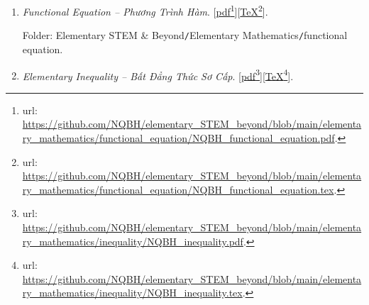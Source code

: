 \documentclass[12pt,oneside]{book}
\begin{document}
\begin{enumerate}
	Folder: {\sf Elementary STEM \& Beyond{\tt/}Elementary Mathematics{\tt/}equation \& inequation{\tt/}problem}.
	\begin{itemize}
		\item {\it Problem \& Solution: Equation \& Inequation -- Bài Tập \& Lời Giải: Phương Trình \& Bất Phương Trình}. [\href{https://github.com/NQBH/elementary_STEM_beyond/blob/main/elementary_mathematics/equation_inequation/solution/NQBH_equation_inequation_solution.pdf}{pdf}\footnote{{\sc url}: \url{https://github.com/NQBH/elementary_STEM_beyond/blob/main/elementary_mathematics/equation_inequation/solution/NQBH_equation_inequation_solution.pdf}.}][\href{https://github.com/NQBH/elementary_STEM_beyond/blob/main/elementary_mathematics/equation_inequation/solution/NQBH_equation_inequation_solution.tex}{\TeX}\footnote{{\sc url}: \url{https://github.com/NQBH/elementary_STEM_beyond/blob/main/elementary_mathematics/equation_inequation/solution/NQBH_equation_inequation_solution.tex}.}].
		
		Folder: {\sf Elementary STEM \& Beyond{\tt/}Elementary Mathematics{\tt/}equation \& inequation{\tt/}solution}.
	\end{itemize}
	\item {\it Functional Equation -- Phương Trình Hàm}. [\href{https://github.com/NQBH/elementary_STEM_beyond/blob/main/elementary_mathematics/functional_equation/NQBH_functional_equation.pdf}{pdf}\footnote{{\sc url}: \url{https://github.com/NQBH/elementary_STEM_beyond/blob/main/elementary_mathematics/functional_equation/NQBH_functional_equation.pdf}.}][\href{https://github.com/NQBH/elementary_STEM_beyond/blob/main/elementary_mathematics/functional_equation/NQBH_functional_equation.tex}{\TeX}\footnote{{\sc url}: \url{https://github.com/NQBH/elementary_STEM_beyond/blob/main/elementary_mathematics/functional_equation/NQBH_functional_equation.tex}.}].
	
	Folder: {\sf Elementary STEM \& Beyond{\tt/}Elementary Mathematics{\tt/}functional equation}.
	\item {\it Elementary Inequality -- Bất Đẳng Thức Sơ Cấp}. [\href{https://github.com/NQBH/elementary_STEM_beyond/blob/main/elementary_mathematics/inequality/NQBH_inequality.pdf}{pdf}\footnote{{\sc url}: \url{https://github.com/NQBH/elementary_STEM_beyond/blob/main/elementary_mathematics/inequality/NQBH_inequality.pdf}.}][\href{https://github.com/NQBH/elementary_STEM_beyond/blob/main/elementary_mathematics/inequality/NQBH_inequality.tex}{\TeX}\footnote{{\sc url}: \url{https://github.com/NQBH/elementary_STEM_beyond/blob/main/elementary_mathematics/inequality/NQBH_inequality.tex}.}].
	

\end{enumerate}
\end{document}
